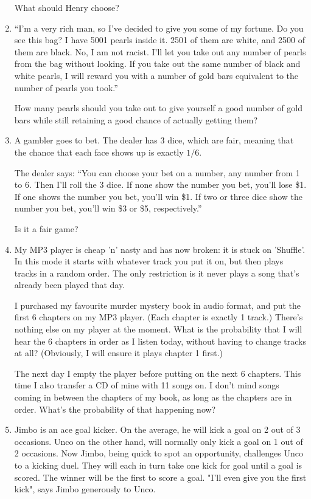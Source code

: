 \documentclass{llncs}
\begin{document}
\begin{enumerate}
What should Henry choose?

\item ``I'm a very rich man, so I've decided to give you some of my fortune. Do you see this bag? I have 5001 pearls inside it. 2501 of them are white, and 2500 of them are black. No, I am not racist. I'll let you take out any number of pearls from the bag without looking. If you take out the same number of black and white pearls, I will reward you with a number of gold bars equivalent to the number of pearls you took.''

How many pearls should you take out to give yourself a good number of gold bars while still retaining a good chance of actually getting them?

\item A gambler goes to bet. The dealer has $3$ dice, which are fair, meaning that the chance that each face shows up is exactly $1/6$.

The dealer says: ``You can choose your bet on a number, any number from 1 to 6. Then I'll roll the $3$ dice. If none show the number you bet, you'll lose \$1. If one shows the number you bet, you'll win \$1. If two or three dice show the number you bet, you'll win \$3 or \$5, respectively.''

Is it a fair game?

\item My MP3 player is cheap 'n' nasty and has now broken: it is stuck on 'Shuffle'. In this mode it starts with whatever track you put it on, but then plays tracks in a random order. The only restriction is it never plays a song that's already been played that day.

I purchased my favourite murder mystery book in audio format, and put the first 6 chapters on my MP3 player. (Each chapter is exactly 1 track.) There's nothing else on my player at the moment. What is the probability that I will hear the 6 chapters in order as I listen today, without having to change tracks at all? (Obviously, I will ensure it plays chapter 1 first.)

The next day I empty the player before putting on the next 6 chapters. This time I also transfer a CD of mine with 11 songs on. I don't mind songs coming in between the chapters of my book, as long as the chapters are in order. What's the probability of that happening now?

\item Jimbo is an ace goal kicker. On the average, he will kick a goal on 2 out of 3 occasions. Unco on the other hand, will normally only kick a goal on 1 out of 2 occasions.
Now Jimbo, being quick to spot an opportunity, challenges Unco to a kicking duel. They will each in turn take one kick for goal until a goal is scored. The winner will be the first to score a goal.
"I'll even give you the first kick", says Jimbo generously to Unco.


\end{enumerate}
\end{document}
